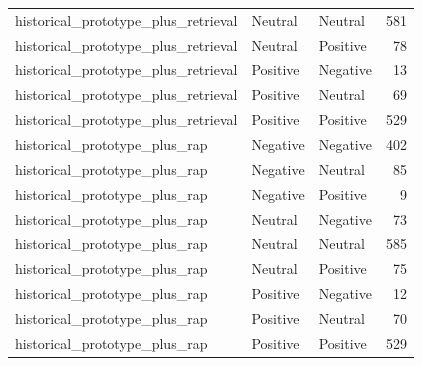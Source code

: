 \begin{tabular}{lllr}
historical_prototype_plus_retrieval & Neutral & Neutral & 581 \\
historical_prototype_plus_retrieval & Neutral & Positive & 78 \\
historical_prototype_plus_retrieval & Positive & Negative & 13 \\
historical_prototype_plus_retrieval & Positive & Neutral & 69 \\
historical_prototype_plus_retrieval & Positive & Positive & 529 \\
historical_prototype_plus_rap & Negative & Negative & 402 \\
historical_prototype_plus_rap & Negative & Neutral & 85 \\
historical_prototype_plus_rap & Negative & Positive & 9 \\
historical_prototype_plus_rap & Neutral & Negative & 73 \\
historical_prototype_plus_rap & Neutral & Neutral & 585 \\
historical_prototype_plus_rap & Neutral & Positive & 75 \\
historical_prototype_plus_rap & Positive & Negative & 12 \\
historical_prototype_plus_rap & Positive & Neutral & 70 \\
historical_prototype_plus_rap & Positive & Positive & 529 \\
\bottomrule
\end{tabular}
